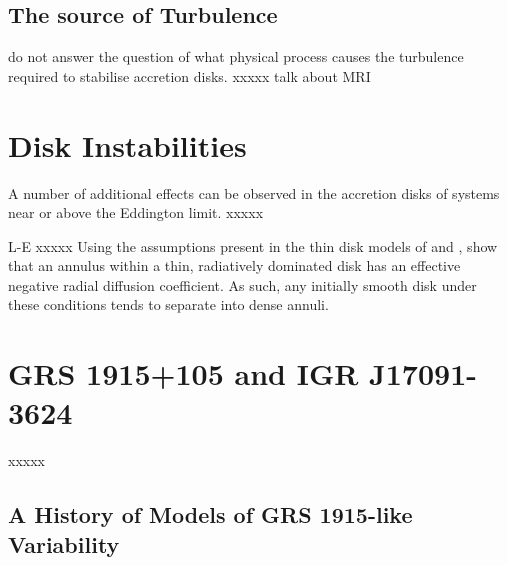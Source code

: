 \subsection{The source of Turbulence}

\par \citet{Shakura_Disk} do not answer the question of what physical process causes the turbulence required to stabilise accretion disks. xxxxx talk about MRI

\section{Disk Instabilities}

\par A number of additional effects can be observed in the accretion disks of systems near or above the Eddington limit. xxxxx

\label{sec:diskinstab}

L-E xxxxx Using the assumptions present in the thin disk models of \citealp{Shakura_Disk} and \citealp{Novikov_Torque}, \citealp{Lightman_Instability} show that an annulus within a thin, radiatively dominated disk has an effective negative radial diffusion coefficient.  As such, any initially smooth disk under these conditions tends to separate into dense annuli.

\section{GRS 1915+105 and IGR J17091-3624}

xxxxx

\subsection{A History of Models of GRS 1915-like Variability}

